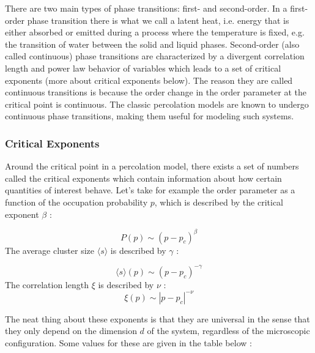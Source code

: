 There are two main types of phase transitions: first- and second-order.
In a first-order phase transition there is what we call a latent heat, i.e. energy that is either absorbed or emitted during a process where the temperature is fixed, e.g. the transition of water between the solid and liquid phases.
Second-order (also called continuous) phase transitions are characterized by a divergent correlation length and power law behavior of variables which leads to a set of critical exponents (more about critical exponents below).
The reason they are called continuous transitions is because the order change in the order parameter at the critical point is continuous.
The classic percolation models are known to undergo continuous phase transitions, making them useful for modeling such systems.









\subsubsection{Critical Exponents}
Around the critical point in a percolation model, there exists a set of numbers called the critical exponents which contain information about how certain quantities of interest behave.
Let's take for example the order parameter as a function of the occupation probability $p$, which is described by the critical exponent $\beta$ \cite{intro_to_percolation_theory}:

\begin{equation}
	\label{eqn:crit_exp_P}
	P(p) \sim (p - p_c)^\beta
\end{equation}
The average cluster size $\langle s \rangle$ is described by $\gamma$ \cite{intro_to_percolation_theory}:

\begin{equation}
	\label{eqn:crit_exp_s}
	\langle s \rangle (p) \sim (p - p_c)^{-\gamma}
\end{equation}
The correlation length $\xi$ is described by $\nu$ \cite{intro_to_percolation_theory}:
\begin{equation}
	\label{eqn:crit_exp_xi}
	\xi (p) \sim |p - p_c|^{-\nu}
\end{equation}

The neat thing about these exponents is that they are universal in the sense that they only depend on the dimension $d$ of the system, regardless of the microscopic configuration.
Some values for these are given in the table below \cite{intro_to_percolation_theory}:

